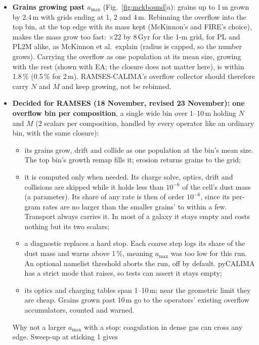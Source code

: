\documentclass[11pt,a4paper]{article}
\begin{document}
\begin{itemize}
\item \textbf{Grains growing past $a_{\max}$} (Fig.~\ref{fig:mckbound}a): grains up to 1\,\textmu m grown by
  2.4\,\textmu m with grids ending at 1, 2 and 4\,\textmu m. Rebinning the overflow into the top bin, at the top edge
  with its mass kept (McKinnon's and FIRE's choice), makes the mass grow too fast: $\times$22 by 8\,Gyr for the
  1-\textmu m grid, for PL and PL2M alike, as McKinnon et al.\ explain (radius is capped, so the number grows). Carrying
  the overflow as one population at its mean size, growing with the rest (shown with EA; the closure does not matter
  here), is within 1.8\,\% (0.5\,\% for 2\,\textmu m).
  RAMSES-CALIMA's overflow collector should therefore carry $N$ and $M$ and keep growing, not be rebinned.
\item \textbf{Decided for RAMSES (18 November, revised 23 November): one overflow bin per composition}, a single
  wide bin over 1--10\,\textmu m holding $N$ and $M$ (2 scalars per composition, handled by every operator like an
  ordinary bin, with the same closure):
  \begin{itemize}
  \item its grains grow, drift and collide as one population at the bin's mean size. The top bin's growth remap fills
    it; erosion returns grains to the grid;
  \item it is computed only when needed. Its charge solve, optics, drift and collisions are skipped while it holds
    less than $10^{-6}$ of the cell's dust mass (a parameter). Its share of any rate is then of order $10^{-6}$, since
    its per-gram rates are no larger than the smaller grains' to within a few. Transport always carries it. In most
    of a galaxy it stays empty and costs nothing but its two scalars;
  \item a diagnostic replaces a hard stop. Each coarse step logs its share of the dust mass and warns above 1\,\%,
    meaning $a_{\max}$ was too low for this run. An optional namelist threshold aborts the run, off by default.
    pyCALIMA has a strict mode that raises, so tests can assert it stays empty;
  \item its optics and charging tables span 1--10\,\textmu m; near the geometric limit they are cheap. Grains
    grown past 10\,\textmu m go to the operators' existing overflow accumulators, counted and warned.
  \end{itemize}
  Why not a larger $a_{\max}$ with a stop: coagulation in dense gas can cross any edge. Sweep-up at sticking 1 gives

\end{itemize}
\end{document}
